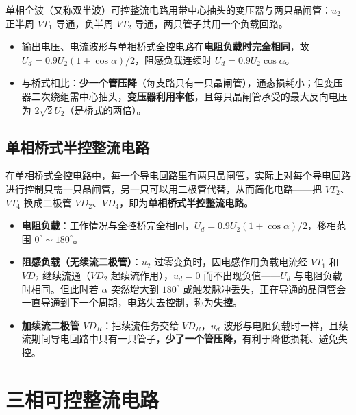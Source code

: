 单相全波（又称双半波）可控整流电路用带中心抽头的变压器与两只晶闸管：$u_2$ 正半周 $VT_1$ 导通，负半周 $VT_2$ 导通，两只管子共用一个负载回路。

\begin{itemize}
  \item 输出电压、电流波形与单相桥式全控电路在\textbf{电阻负载时完全相同}，故 $U_d=0.9U_2(1+\cos\alpha)/2$，阻感负载连续时 $U_d=0.9U_2\cos\alpha$。
  \item 与桥式相比：\textbf{少一个管压降}（每支路只有一只晶闸管），通态损耗小；但变压器二次绕组需中心抽头，\textbf{变压器利用率低}，且每只晶闸管承受的最大反向电压为 $2\sqrt{2}U_2$（是桥式的两倍）。
\end{itemize}

\subsection{单相桥式半控整流电路}

在单相桥式全控电路中，每一个导电回路里有两只晶闸管，实际上对每个导电回路进行控制只需一只晶闸管，另一只可以用二极管代替，从而简化电路——把 $VT_2$、$VT_4$ 换成二极管 $VD_2$、$VD_4$，即为\textbf{单相桥式半控整流电路}。

\begin{itemize}
  \item \textbf{电阻负载}：工作情况与全控桥完全相同，$U_d=0.9U_2(1+\cos\alpha)/2$，移相范围 $0^\circ\sim180^\circ$。
  \item \textbf{阻感负载（无续流二极管）}：$u_2$ 过零变负时，因电感作用负载电流经 $VT_1$ 和 $VD_2$ 继续流通（$VD_2$ 起续流作用），$u_d=0$ 而不出现负值——$U_d$ 与电阻负载时相同。但此时若 $\alpha$ 突然增大到 $180^\circ$ 或触发脉冲丢失，正在导通的晶闸管会一直导通到下一个周期，电路失去控制，称为\textbf{失控}。
  \item \textbf{加续流二极管 $VD_R$}：把续流任务交给 $VD_R$，$u_d$ 波形与电阻负载时一样，且续流期间导电回路中只有一只管子，\textbf{少了一个管压降}，有利于降低损耗、避免失控。
\end{itemize}


\section{三相可控整流电路}

